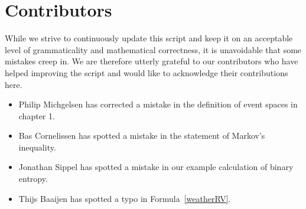 \section*{Contributors}
While we strive to continuously update this script and keep it on an acceptable level of grammaticality and mathematical correctness, it is unavoidable that some
mistakes creep in. We are therefore utterly grateful to our contributors who have helped improving the script and would like to acknowledge their contributions here.
\begin{itemize}
\item Philip Michgelsen has corrected a mistake in the definition of event spaces in chapter 1.
\item Bas Cornelissen has spotted a mistake in the statement of Markov's inequality.
\item Jonathan Sippel has spotted a mistake in our example calculation
  of binary entropy.
\item Thijs Baaijen has spotted a typo in Formula~\eqref{weatherRV}.
\end{itemize}